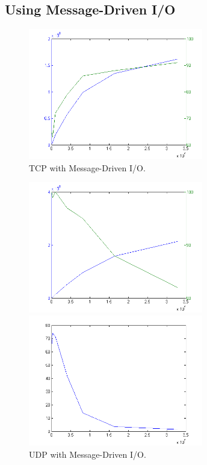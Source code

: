 \documentclass[11pt]{article}
\begin{document}
\subsection{Using Message-Driven I/O}
\begin{figure}
\centering
\includegraphics[width=3in]{tcp-msg.png}
\caption{TCP with Message-Driven I/O.}
\label{fig:TCP}
\end{figure}

\begin{figure}
\begin{minipage}[c]{0.5\textwidth} 
\centering 
\includegraphics[width=3in]{udp-msg.png} 
\end{minipage}%
\begin{minipage}[c]{0.5\textwidth} 
\centering 
\includegraphics[width=3in]{udp-msg-lost.png}
\end{minipage}%
\caption{UDP with Message-Driven I/O.}
\label{fig:TCP}
\end{figure}
\end{document}

